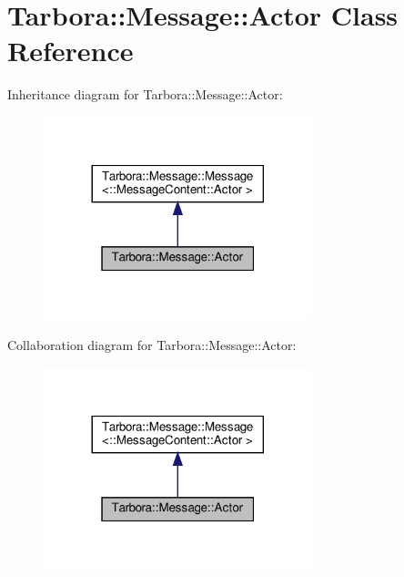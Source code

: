 \hypertarget{classTarbora_1_1Message_1_1Actor}{}\section{Tarbora\+:\+:Message\+:\+:Actor Class Reference}
\label{classTarbora_1_1Message_1_1Actor}


Inheritance diagram for Tarbora\+:\+:Message\+:\+:Actor\+:
\nopagebreak
\begin{figure}[H]
\begin{center}
\leavevmode
\includegraphics[width=221pt]{classTarbora_1_1Message_1_1Actor__inherit__graph}
\end{center}
\end{figure}


Collaboration diagram for Tarbora\+:\+:Message\+:\+:Actor\+:
\nopagebreak
\begin{figure}[H]
\begin{center}
\leavevmode
\includegraphics[width=221pt]{classTarbora_1_1Message_1_1Actor__coll__graph}
\end{center}
\end{figure}
